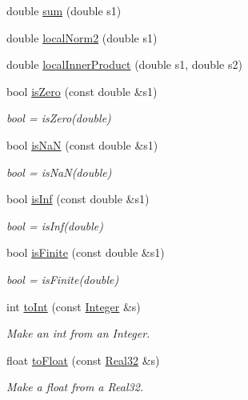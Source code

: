 \begin{DoxyCompactItemize}
\item 
double \mbox{\hyperlink{group__simpleword_ga1c90ffe9d470fcf3fa16425a40f8fe79}{sum}} (double s1)
\item 
double \mbox{\hyperlink{group__simpleword_ga439dd5edaf993eb5a6cc2c943b3b7f55}{local\+Norm2}} (double s1)
\item 
double \mbox{\hyperlink{group__simpleword_gab6f623d6de3ec5cfdd1bdd30d067b64d}{local\+Inner\+Product}} (double s1, double s2)
\item 
bool \mbox{\hyperlink{group__simpleword_ga4696caf7dc1e9600520fb4255cc74d92}{is\+Zero}} (const double \&s1)
\begin{DoxyCompactList}\small\item\em bool = is\+Zero(double) \end{DoxyCompactList}\item 
bool \mbox{\hyperlink{group__simpleword_gaa7a998c5bfdb665a4e386ccc415407bd}{is\+NaN}} (const double \&s1)
\begin{DoxyCompactList}\small\item\em bool = is\+Na\+N(double) \end{DoxyCompactList}\item 
bool \mbox{\hyperlink{group__simpleword_ga915c6e8e5b5de2ebf1b3a8e57f95bf2f}{is\+Inf}} (const double \&s1)
\begin{DoxyCompactList}\small\item\em bool = is\+Inf(double) \end{DoxyCompactList}\item 
bool \mbox{\hyperlink{group__simpleword_ga9bc1e56e3c76d5eb1575eb3eed62ea40}{is\+Finite}} (const double \&s1)
\begin{DoxyCompactList}\small\item\em bool = is\+Finite(double) \end{DoxyCompactList}\item 
int \mbox{\hyperlink{namespaceENSEM_ada64466467bc2ca84cb2b64dffa8dd02}{to\+Int}} (const \mbox{\hyperlink{group__defs_gab13d060149cdd80ab40fd8d653f60117}{Integer}} \&s)
\begin{DoxyCompactList}\small\item\em Make an int from an Integer. \end{DoxyCompactList}\item 
float \mbox{\hyperlink{namespaceENSEM_a109a3e3e759ebd30afae927366900cd6}{to\+Float}} (const \mbox{\hyperlink{group__defs_gab601f1c55eb75baed0a0859b3fec6bc1}{Real32}} \&s)
\begin{DoxyCompactList}\small\item\em Make a float from a Real32. \end{DoxyCompactList}\item 

\end{DoxyCompactItemize}
